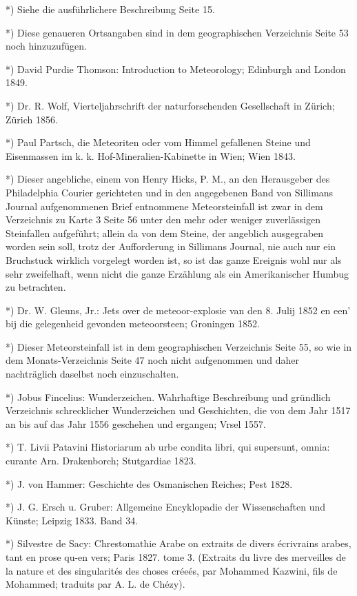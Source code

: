 \documentclass[a4paper, 8pt, oneside, polutonikogreek, german]{article}
\begin{document}
*) Siehe die ausführlichere Beschreibung Seite 15.

*) Diese genaueren Ortsangaben sind in dem geographischen Verzeichnis Seite 53 noch hinzuzufügen.

*) David Purdie Thomson: Introduction to Meteorology; Edinburgh and London 1849.

*) Dr. R. Wolf, Vierteljahrschrift der naturforschenden Gesellschaft in Zürich; Zürich 1856.

*) Paul Partsch, die Meteoriten oder vom Himmel gefallenen Steine und Eisenmassen im k. k. Hof-Mineralien-Kabinette in Wien; Wien 1843.

*) Dieser angebliche, einem von Henry Hicks, P. M., an den Herausgeber des Philadelphia Courier gerichteten und in den angegebenen Band von Sillimans Journal aufgenommenen Brief entnommene Meteorsteinfall ist zwar in dem Verzeichnis zu Karte 3 Seite 56 unter den mehr oder weniger zuverlässigen Steinfallen aufgeführt; allein da von dem Steine, der angeblich ausgegraben worden sein soll, trotz der Aufforderung in Sillimans Journal, nie auch nur ein Bruchstuck wirklich vorgelegt worden ist, so ist das ganze Ereignis wohl nur als sehr zweifelhaft, wenn nicht die ganze Erzählung als ein Amerikanischer Humbug zu betrachten.

*) Dr. W. Gleuns, Jr.: Jets over de meteoor-explosie van den 8. Julij 1852 en een' bij die gelegenheid gevonden meteoorsteen; Groningen 1852.

*) Dieser Meteorsteinfall ist in dem geographischen Verzeichnis Seite 55, so wie in dem Monats-Verzeichnis Seite 47 noch nicht aufgenommen und daher nachträglich daselbst noch einzuschalten.

*) Jobus Fincelius: Wunderzeichen. Wahrhaftige Beschreibung und gründlich Verzeichnis schrecklicher Wunderzeichen und Geschichten, die von dem Jahr 1517 an bis auf das Jahr 1556 geschehen und ergangen; Vrsel 1557.

*) T. Livii Patavini Historiarum ab urbe condita libri, qui supersunt, omnia: curante Arn. Drakenborch; Stutgardiae 1823.

*) J. von Hammer: Geschichte des Osmanischen Reiches; Pest 1828.

*) J. G. Ersch u. Gruber: Allgemeine Encyklopadie der Wissenschaften und Künste; Leipzig 1833. Band 34.

*) Silvestre de Sacy: Chrestomathie Arabe on extraits de divers écrivrains arabes, tant en prose qu-en vers; Paris 1827. tome 3. (Extraits du livre des merveilles de la nature et des singularités des choses créeés, par Mohammed Kazwini, fils de Mohammed; traduits par A. L. de Chézy).
\end{document}
